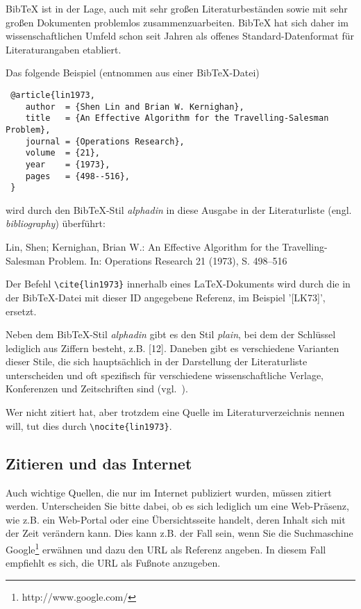 BibTeX ist in der Lage, auch mit sehr großen Literaturbeständen sowie mit sehr großen Dokumenten problemlos zusammenzuarbeiten. BibTeX hat sich daher im wissenschaftlichen Umfeld schon seit Jahren als offenes Standard-Datenformat für Literaturangaben etabliert.

Das folgende Beispiel (entnommen aus einer BibTeX-Datei)

\begin{verbatim}
 @article{lin1973,
    author  = {Shen Lin and Brian W. Kernighan},
    title   = {An Effective Algorithm for the Travelling-Salesman Problem},
    journal = {Operations Research},
    volume  = {21},
    year    = {1973},
    pages   = {498--516},
 }
\end{verbatim}

wird durch den BibTeX-Stil {\em alphadin} in diese Ausgabe in der Literaturliste (engl. {\em bibliography}) überführt:

\medskip
[LK73] Lin, Shen; Kernighan, Brian W.: An Effective Algorithm for the Travelling-Salesman Problem. In: Operations Research 21 (1973), S. 498--516
\medskip

Der Befehl \verb+\cite{lin1973}+ innerhalb eines LaTeX-Dokuments wird durch die in der BibTeX-Datei mit dieser ID angegebene Referenz, im Beispiel '[LK73]', ersetzt.

Neben dem BibTeX-Stil {\em alphadin} gibt es den Stil {\em plain}, bei dem der Schlüssel lediglich aus Ziffern besteht, z.B. [12]. Daneben gibt es verschiedene Varianten dieser Stile, die sich hauptsächlich in der Darstellung der Literaturliste unterscheiden und oft spezifisch für verschiedene wissenschaftliche Verlage, Konferenzen und Zeitschriften sind (vgl.~\cite{bibstyle}).

Wer nicht zitiert hat, aber trotzdem eine Quelle im Literaturverzeichnis nennen will, tut dies durch \verb+\nocite{lin1973}+.

\nocite{lin1973}

\nocite{*} %

\subsection{Zitieren und das Internet}
Auch wichtige Quellen, die nur im Internet publiziert wurden, müssen zitiert werden.
Unterscheiden Sie bitte dabei, ob es sich lediglich um eine Web-Präsenz, wie z.B. ein Web-Portal oder eine Übersichtsseite handelt, deren Inhalt sich mit der Zeit verändern kann. 
Dies kann z.B. der Fall sein, wenn Sie die Suchmaschine Google\footnote{http://www.google.com/} erwähnen und dazu den URL als Referenz angeben.
In diesem Fall empfiehlt es sich, die URL als Fußnote anzugeben.

